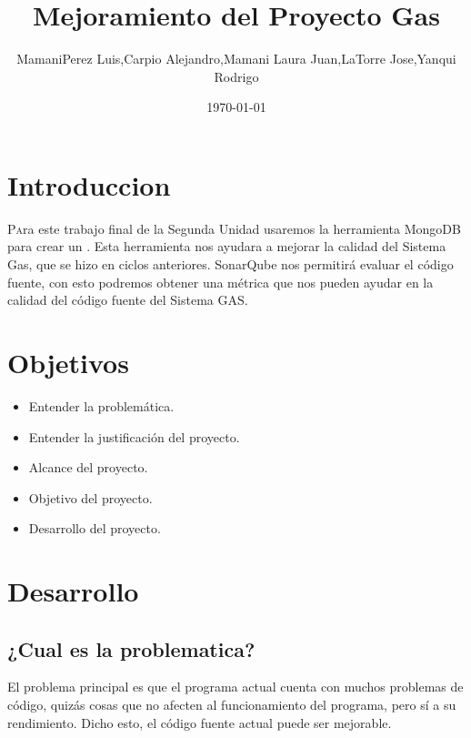 \documentclass[twoside,twocolumn]{article}
\title{Mejoramiento del Proyecto Gas} %
\author{MamaniPerez Luis,Carpio Alejandro,Mamani Laura Juan,LaTorre Jose,Yanqui  Rodrigo}
\date{\today} %
\begin{document}
\maketitle


\section{Introduccion}

\lettrine[nindent=0em,lines=2]{P}ara este trabajo final de la Segunda Unidad usaremos la herramienta MongoDB para crear un . Esta herramienta nos ayudara a mejorar la calidad del Sistema Gas, que se hizo en ciclos anteriores. SonarQube nos permitirá evaluar el código fuente, con esto podremos obtener una métrica que nos pueden ayudar en la calidad del código fuente del Sistema GAS.

\section{Objetivos}

\begin{itemize}
\item Entender la problemática.
\item Entender la justificación del proyecto.
\item Alcance del proyecto.
\item Objetivo del proyecto.
\item Desarrollo del proyecto.

\end{itemize}

\section{Desarrollo}

\subsection{¿Cual es la problematica?}
El problema principal es que el programa actual cuenta con muchos problemas de código, quizás cosas que no afecten al funcionamiento del programa, pero sí a su rendimiento. Dicho esto, el código fuente actual puede ser mejorable. 
 
\end{document}
